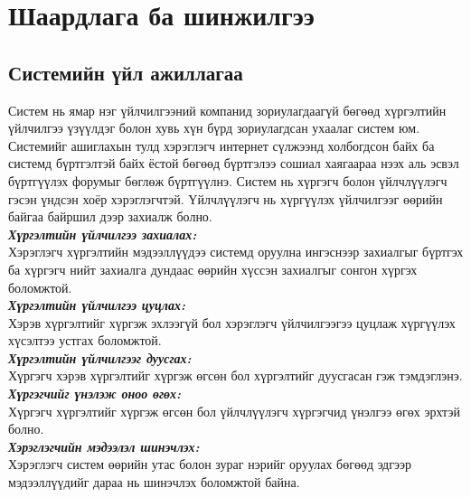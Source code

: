 
\pagecolor{ChapterYellow}
\chapter{Шаардлага ба шинжилгээ} %

\label{Chapter2} %
\pagecolor{white}
\section{Системийн үйл ажиллагаа}

Систем нь ямар нэг үйлчилгээний компанид зориулагдаагүй бөгөөд хүргэлтийн үйлчилгээ үзүүлдэг болон хувь хүн бүрд зориулагдсан ухаалаг систем юм. Системийг ашиглахын тулд хэрэглэгч интернет сүлжээнд холбогдсон байх ба системд бүртгэлтэй байх ёстой бөгөөд бүртгэлээ сошиал хаягаараа нээх аль эсвэл бүртгүүлэх форумыг бөглөж бүртгүүлнэ. Систем нь хүргэгч болон үйлчлүүлэгч гэсэн үндсэн хоёр хэрэглэгчтэй. Үйлчлүүлэгч нь хүргүүлэх үйлчилгээг өөрийн байгаа байршил дээр захиалж болно.\\
\textit{\textbf{Хүргэлтийн үйлчилгээ захиалах:}}\\
Хэрэглэгч хүргэлтийн мэдээллүүдээ системд оруулна ингэснээр захиалгыг бүртгэх ба хүргэгч нийт захиалга дундаас өөрийн хүссэн захиалгыг сонгон хүргэх боломжтой.\\
\textit{\textbf{Хүргэлтийн үйлчилгээ цуцлах:}}\\
Хэрэв хүргэлтийг хүргэж эхлээгүй бол хэрэглэгч үйлчилгээгээ цуцлаж хүргүүлэх хүсэлтээ устгах боломжтой.\\
\textit{\textbf{Хүргэлтийн үйлчилгээг дуусгах:}}\\
Хүргэгч хэрэв хүргэлтийг хүргэж өгсөн бол хүргэлтийг дуусгасан гэж тэмдэглэнэ.\\
\textit{\textbf{Хүргэгчийг үнэлэж оноо өгөх:}}\\
Хүргэгч хүргэлтийг хүргэж өгсөн бол үйлчлүүлэгч хүргэгчид үнэлгээ өгөх эрхтэй болно.\\
\textit{\textbf{Хэрэглэгчийн мэдээлэл шинэчлэх:}}\\
Хэрэглэгч систем өөрийн утас болон зураг нэрийг оруулах бөгөөд эдгээр мэдээллүүдийг дараа нь шинэчлэх боломжтой байна.


